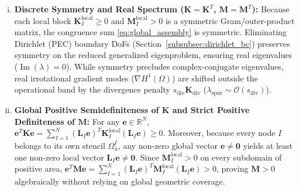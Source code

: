 \documentclass[VANCOUVER]{USG}
\begin{document}
\begin{enumerate}[(i)]
    \item \textbf{Discrete Symmetry and Real Spectrum ($\mathbf{K} = \mathbf{K}^T$, $\mathbf{M} = \mathbf{M}^T$):}
          Because each local block $\mathbf{K}_I^{\mathrm{local}} \ge 0$ and $\mathbf{M}_I^{\mathrm{local}} > 0$ is a symmetric Gram/outer-product matrix, the congruence sum \eqref{eq:global_assembly} is symmetric. Eliminating Dirichlet (PEC) boundary DoFs (Section~\ref{subsubsec:dirichlet_bc}) preserves symmetry on the reduced generalized eigenproblem, ensuring real eigenvalues ($\operatorname{Im}(\lambda) = 0$). While symmetry precludes complex-conjugate eigenvalues, real irrotational gradient modes ($\nabla H^1(\Omega)$) are shifted outside the operational band by the divergence penalty $s_{\mathrm{div}}\mathbf{K}_{\mathrm{div}}$ ($\lambda_{\mathrm{spur}} \sim \mathcal{O}(s_{\mathrm{div}})$).
    \item \textbf{Global Positive Semidefiniteness of $\mathbf{K}$ and Strict Positive Definiteness of $\mathbf{M}$:}
          For any $\mathbf{e} \in \mathbb{R}^N$, $\mathbf{e}^T \mathbf{K} \mathbf{e} = \sum_{I=1}^N (\mathbf{L}_I \mathbf{e})^T \mathbf{K}_I^{\mathrm{local}} (\mathbf{L}_I \mathbf{e}) \ge 0$. Moreover, because every node $I$ belongs to its own stencil $\Omega_u^I$, any non-zero global vector $\mathbf{e} \ne \mathbf{0}$ yields at least one non-zero local vector $\mathbf{L}_I \mathbf{e} \ne \mathbf{0}$. Since $\mathbf{M}_I^{\mathrm{local}} > 0$ on every subdomain of positive area, $\mathbf{e}^T \mathbf{M} \mathbf{e} = \sum_{I=1}^N (\mathbf{L}_I \mathbf{e})^T \mathbf{M}_I^{\mathrm{local}} (\mathbf{L}_I \mathbf{e}) > 0$, proving $\mathbf{M} > 0$ algebraically without relying on global geometric coverage.
\end{enumerate}
\end{document}
